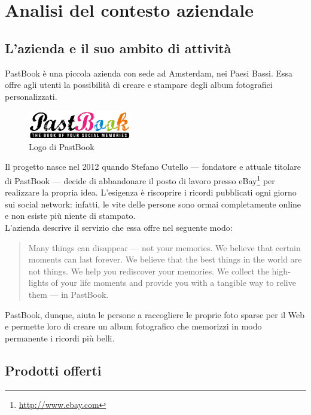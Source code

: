 \chapter{Analisi del contesto aziendale}
	\section{L'azienda e il suo ambito di attività}
		PastBook è una piccola azienda con sede ad Amsterdam, nei Paesi Bassi. Essa offre agli utenti la possibilità di creare e stampare
		degli album fotografici personalizzati.
		\begin{figure}[H]
			\centering
			\includegraphics[width=0.4\textwidth]{capitolo_1/immagini/logo_pastbook.png}
			\caption[Logo di PastBook]{Logo di PastBook\protect\footnotemark}
		\end{figure}
		\noindent Il progetto nasce nel 2012 quando Stefano Cutello — fondatore e attuale titolare di PastBook — decide di abbandonare il
		posto di lavoro presso eBay\footnote{\url{http://www.ebay.com}} per realizzare la propria idea. L'esigenza è riscoprire i
		ricordi pubblicati ogni giorno sui social network: infatti, le vite delle persone sono ormai completamente online e non esiste più
		niente di stampato.\\
		L'azienda descrive il servizio che essa offre nel seguente modo:
		\hyphenblockquote{english}{Many things can disappear — not your memories. We believe that certain moments can last forever. We
			believe that the best things in the world are not things. We help you rediscover your memories. We collect the highlights of
			your life moments and provide you with a tangible way to relive them — in PastBook.}
		PastBook, dunque, aiuta le persone a raccogliere le proprie foto sparse per il Web e permette loro di creare un album fotografico
		che memorizzi in modo permanente i ricordi più belli.
	\section{Prodotti offerti}
